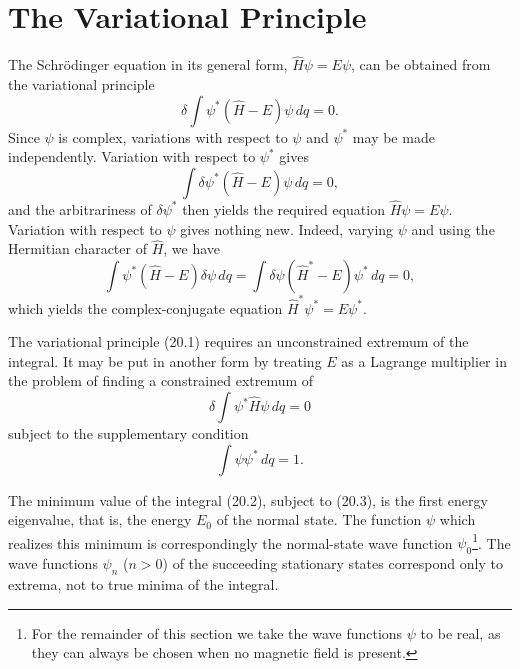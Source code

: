 \section{The Variational Principle}

The Schrödinger equation in its general form, $\hat H\psi=E\psi$, can be
obtained from the variational principle
\begin{equation}
  \delta\int\psi^*(\hat H-E)\psi\,dq=0.
  \tag{20.1}
\end{equation}
Since $\psi$ is complex, variations with respect to $\psi$ and $\psi^*$ may
be made independently. Variation with respect to $\psi^*$ gives
\[
  \int\delta\psi^*(\hat H-E)\psi\,dq=0,
\]
and the arbitrariness of $\delta\psi^*$ then yields the required equation
$\hat H\psi=E\psi$. Variation with respect to $\psi$ gives nothing new.
Indeed, varying $\psi$ and using the Hermitian character%
of $\hat H$, we have
\[
  \int\psi^*(\hat H-E)\delta\psi\,dq
  =\int\delta\psi(\hat H^*-E)\psi^*\,dq=0,
\]
which yields the complex-conjugate equation
$\hat H^*\psi^*=E\psi^*$.

The variational principle (20.1) requires an unconstrained extremum of the
integral. It may be put in another form by treating $E$ as a Lagrange
multiplier in the problem of finding a constrained extremum of
\begin{equation}
  \delta\int\psi^*\hat H\psi\,dq=0
  \tag{20.2}
\end{equation}
subject to the supplementary condition
\begin{equation}
  \int\psi\psi^*\,dq=1.
  \tag{20.3}
\end{equation}

The minimum value of the integral (20.2), subject to (20.3), is the first
energy eigenvalue, that is, the energy $E_0$ of the normal state. The function
$\psi$ which realizes this minimum is correspondingly the normal-state wave
function $\psi_0$\footnote{For the remainder of this section we take the wave
functions $\psi$ to be real, as they can always be chosen when no magnetic
field is present.}. The wave functions $\psi_n$ ($n>0$) of the succeeding
stationary states correspond only to extrema, not to true minima of the
integral.


